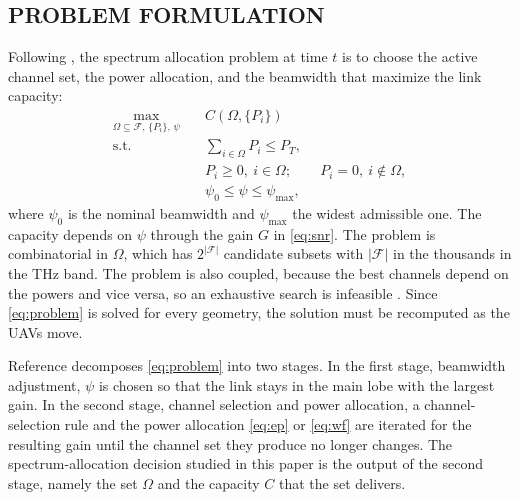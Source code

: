 \documentclass{ieee-ojvt}
\begin{document}
\subsection{PROBLEM FORMULATION}
\label{sec:problem}
Following \cite{10399804}, the spectrum allocation problem at time $t$ is to
choose the active channel set, the power allocation, and the beamwidth that maximize the
link capacity:
\begin{subequations}
\label{eq:problem}
\begin{align}
\max_{\Omega\subseteq\mathcal{F},\,\{P_i\},\,\psi}\quad & C(\Omega,\{P_i\})
\label{eq:obj}\\
\text{s.t.}\quad & \textstyle\sum_{i\in\Omega}P_i\le P_T,
\label{eq:c1}\\
& P_i\ge0,\ i\in\Omega;\qquad P_i=0,\ i\notin\Omega,
\label{eq:c2}\\
& \psi_0\le\psi\le\psi_{\max},
\label{eq:c3}
\end{align}
\end{subequations}
where $\psi_0$ is the nominal beamwidth and $\psi_{\max}$ the widest admissible one. The
capacity depends on $\psi$ through the gain $G$ in \eqref{eq:snr}. The problem is
combinatorial in $\Omega$, which has $2^{|\mathcal{F}|}$ candidate subsets with
$|\mathcal{F}|$ in the thousands in the THz band. The problem is also coupled, because the
best channels depend on the powers and vice versa, so an exhaustive search is infeasible
\cite{10399804}. Since \eqref{eq:problem} is solved for every geometry, the
solution must be recomputed as the UAVs move.

Reference \cite{10399804} decomposes \eqref{eq:problem} into two stages. In the
first stage, beamwidth adjustment, $\psi$ is chosen so that the link stays in the main
lobe with the largest gain. In the second stage, channel selection and power allocation, a
channel-selection rule and the power allocation \eqref{eq:ep} or \eqref{eq:wf} are
iterated for the resulting gain until the channel set they produce no longer changes. The
spectrum-allocation decision studied in this paper is the output of the second stage,
namely the set $\Omega$ and the capacity $C$ that the set delivers.
\end{document}
